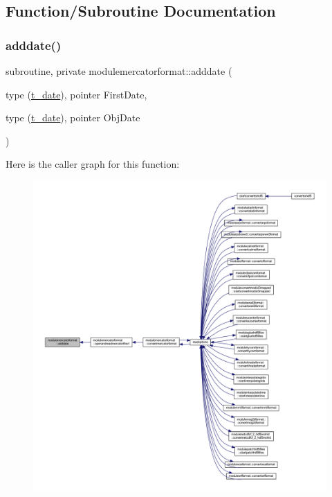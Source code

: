 \subsection{Function/\+Subroutine Documentation}
\mbox{\label{namespacemodulemercatorformat_af022169c1f02b5fca22275beb30ca516}} 
\subsubsection{\texorpdfstring{adddate()}{adddate()}}
{\footnotesize\ttfamily subroutine, private modulemercatorformat\+::adddate (\begin{DoxyParamCaption}\item[{type (\mbox{\hyperlink{structmodulemercatorformat_1_1t__date}{t\+\_\+date}}), pointer}]{First\+Date,  }\item[{type (\mbox{\hyperlink{structmodulemercatorformat_1_1t__date}{t\+\_\+date}}), pointer}]{Obj\+Date }\end{DoxyParamCaption})\hspace{0.3cm}{\ttfamily [private]}}

Here is the caller graph for this function\+:\nopagebreak
\begin{figure}[H]
\begin{center}
\leavevmode
\includegraphics[width=350pt]{namespacemodulemercatorformat_af022169c1f02b5fca22275beb30ca516_icgraph}
\end{center}
\end{figure}
\mbox{\label{namespacemodulemercatorformat_ad07eac9a69191b73461fe88c7b6540d1}} 
